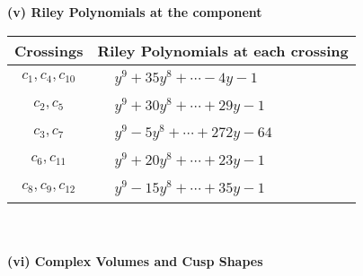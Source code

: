 \documentclass[1p]{elsarticle_modified}
\theoremstyle{definition}
\begin{document}
\flushleft \textbf{(v) Riley Polynomials at the component}\newline \\
\begin{tabular}{m{50pt}|m{274pt}}
Crossings & \hspace{64pt}Riley Polynomials at each crossing \\
\hline $$\begin{aligned}c_{1},c_{4},c_{10}\end{aligned}$$&$\begin{aligned}
&y^9+35 y^8+\cdots-4 y-1
\end{aligned}$\\
\hline $$\begin{aligned}c_{2},c_{5}\end{aligned}$$&$\begin{aligned}
&y^9+30 y^8+\cdots+29 y-1
\end{aligned}$\\
\hline $$\begin{aligned}c_{3},c_{7}\end{aligned}$$&$\begin{aligned}
&y^9-5 y^8+\cdots+272 y-64
\end{aligned}$\\
\hline $$\begin{aligned}c_{6},c_{11}\end{aligned}$$&$\begin{aligned}
&y^9+20 y^8+\cdots+23 y-1
\end{aligned}$\\
\hline $$\begin{aligned}c_{8},c_{9},c_{12}\end{aligned}$$&$\begin{aligned}
&y^9-15 y^8+\cdots+35 y-1
\end{aligned}$\\
\hline
\end{tabular}\\~\\
\newpage\flushleft \textbf{(vi) Complex Volumes and Cusp Shapes}
\end{document}
